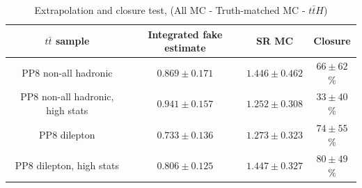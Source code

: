 \documentclass[11pt]{article}
\begin{document}
	\begin{table}[htp]
	\caption{Extrapolation and closure test, (All MC - Truth-matched MC - $t\bar{t}H$) }
	\begin{center}
	\begin{tabular}{|c|c|c|c|}
	\hline
	$t\bar{t}$ sample 	& Integrated fake estimate	& SR MC	&  Closure \\
	\hline
	PP8 non-all hadronic				& 	$0.869\pm0.171$ 		& $1.446\pm0.462$ 		& $66\pm62$\% \\
	PP8 non-all hadronic, high stats		& 	$0.941\pm0.157$ 		& $1.252\pm0.308$		& $33\pm40$\% \\
	PP8 dilepton 					& 	$0.733\pm0.136$ 		& $1.273\pm0.323$		& $74\pm55$\% \\
	PP8 dilepton, high stats			& 	$0.806\pm0.125$ 		& $1.447\pm0.327$ 		& $80\pm49$\% \\
	\hline
	\end{tabular}
	\end{center}
	\label{default}
	\end{table}%
\end{document}
